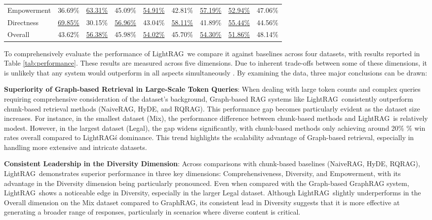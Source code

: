 \documentclass{article} %
\def\model{LightRAG}
\begin{document}
\begin{table}[h]
{\begin{tabular}{@{}lcccccccc@{}}
Empowerment            & 36.69\%      & \underline{63.31\%}     & 45.09\%      & \underline{54.91\%}     & 42.81\%      & \underline{57.19\%}     & \underline{52.94\%}      & 47.06\%     \\
Directness             & \underline{69.85\%}      & 30.15\%     & \underline{56.96\%}      & 43.04\%     & \underline{58.11\%}      & 41.89\%     & \underline{55.44\%}      & 44.56\%     \\
Overall                & 43.62\%      & \underline{56.38\%}     & 45.98\%      & \underline{54.02\%}     & 45.70\%      & \underline{54.30\%}     & \underline{51.86\%}      & 48.14\%     \\
\bottomrule
\end{tabular}
}
\end{table}

To comprehensively evaluate the performance of \model\, we compare it against baselines across four datasets, with results reported in Table \ref{tab:performance}. These results are measured across five dimensions. Due to inherent trade-offs between some of these dimensions, it is unlikely that any system would outperform in all aspects simultaneously \cite{edge2024local}. By examining the data, three major conclusions can be drawn:

\textbf{Superiority of Graph-based Retrieval in Large-Scale Token Queries}: 
When dealing with large token counts and complex queries requiring comprehensive consideration of the dataset's background, Graph-based RAG systems like \model\ consistently outperform chunk-based retrieval methods (NaiveRAG, HyDE, and RQRAG). This performance gap becomes particularly evident as the dataset size increases. For instance, in the smallest dataset (Mix), the performance difference between chunk-based methods and \model\ is relatively modest. However, in the largest dataset (Legal), the gap widens significantly, with chunk-based methods only achieving around 20\% \% win rates overall compared to \model\'s dominance. This trend highlights the scalability advantage of Graph-based retrieval, especially in handling more extensive and intricate datasets.
    
\textbf{Consistent Leadership in the Diversity Dimension}: 
Across comparisons with chunk-based baselines (NaiveRAG, HyDE, RQRAG), \model\ demonstrates superior performance in three key dimensions: Comprehensiveness, Diversity, and Empowerment, with its advantage in the Diversity dimension being particularly pronounced. Even when compared with the Graph-based GraphRAG system, \model\ shows a noticeable edge in Diversity, especially in the larger Legal dataset. Although \model\ slightly underperforms in the Overall dimension on the Mix dataset compared to GraphRAG, its consistent lead in Diversity suggests that it is more effective at generating a broader range of responses, particularly in scenarios where diverse content is critical.
    
\end{document}
